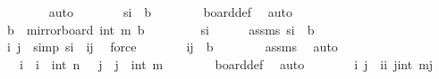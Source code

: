 \begin{isabellebody}
\ \ \ \ \ \ \isamarkupfalse%
\ auto\isanewline
\ \ \ \ \isamarkupfalse%
\ \isamarkupfalse%
\ {\isachardoublequoteopen}s\isactrlsub i{\isacharprime}{\kern0pt}\ {\isasymin}\ {\isacharquery}{\kern0pt}b{\isachardoublequoteclose}\isanewline
\ \ \ \ \ \ \isamarkupfalse%
\ board{\isacharunderscore}{\kern0pt}def\ \isamarkupfalse%
\ auto\isanewline
\ \ \isamarkupfalse%
\isanewline
{}\isamarkupfalse%
\isanewline
\ \ \isamarkupfalse%
\ {\isachardoublequoteopen}{\isacharquery}{\kern0pt}b\ {\isasymsubseteq}\ mirror{}{\isacharunderscore}{\kern0pt}board\ {\isacharparenleft}{\kern0pt}int\ m{\isacharplus}{\kern0pt}{}{\isacharparenright}{\kern0pt}\ {\isacharquery}{\kern0pt}b{\isachardoublequoteclose}\isanewline
\ \ \isamarkupfalse%
\isanewline
\ \ \ \ \isamarkupfalse%
\ s\isactrlsub i\isanewline
\ \ \ \ \isamarkupfalse%
\ assms{\isacharcolon}{\kern0pt}\ {\isachardoublequoteopen}s\isactrlsub i\ {\isasymin}\ {\isacharquery}{\kern0pt}b{\isachardoublequoteclose}\isanewline
\ \ \ \ \isamarkupfalse%
\ \isamarkupfalse%
\ i\ j\ \ {\isacharbrackleft}{\kern0pt}simp{\isacharbrackright}{\kern0pt}{\isacharcolon}{\kern0pt}\ {\isachardoublequoteopen}s\isactrlsub i\ {\isacharequal}{\kern0pt}\ {\isacharparenleft}{\kern0pt}i{\isacharcomma}{\kern0pt}j{\isacharparenright}{\kern0pt}{\isachardoublequoteclose}\ \isamarkupfalse%
\ force\isanewline
\ \ \ \ \isamarkupfalse%
\ \isamarkupfalse%
\ {\isachardoublequoteopen}{\isacharparenleft}{\kern0pt}i{\isacharcomma}{\kern0pt}j{\isacharparenright}{\kern0pt}\ {\isasymin}\ {\isacharquery}{\kern0pt}b{\isachardoublequoteclose}\isanewline
\ \ \ \ \ \ \isamarkupfalse%
\ assms\ \isamarkupfalse%
\ auto\isanewline
\ \ \ \ \isamarkupfalse%
\ \isamarkupfalse%
\ {\isachardoublequoteopen}{}\ {\isasymle}\ i\ {\isasymand}\ i\ {\isasymle}\ int\ n{\isachardoublequoteclose}\ {\isachardoublequoteopen}{}\ {\isasymle}\ j\ {\isasymand}\ j\ {\isasymle}\ int\ m{\isachardoublequoteclose}\isanewline
\ \ \ \ \ \ \isamarkupfalse%
\ board{\isacharunderscore}{\kern0pt}def\ \isamarkupfalse%
\ auto\isanewline
\ \ \ \ \isamarkupfalse%
\ \isamarkupfalse%
\ i{\isacharprime}{\kern0pt}\ j{\isacharprime}{\kern0pt}\ \ {\isachardoublequoteopen}i{\isacharprime}{\kern0pt}{\isacharequal}{\kern0pt}i{\isachardoublequoteclose}\ {\isachardoublequoteopen}j{\isacharprime}{\kern0pt}{\isacharequal}{\kern0pt}{\isacharparenleft}{\kern0pt}int\ m{\isacharplus}{\kern0pt}{}{\isacharparenright}{\kern0pt}{\isacharminus}{\kern0pt}j{\isachardoublequoteclose}\ \isamarkupfalse%

\end{isabellebody}
